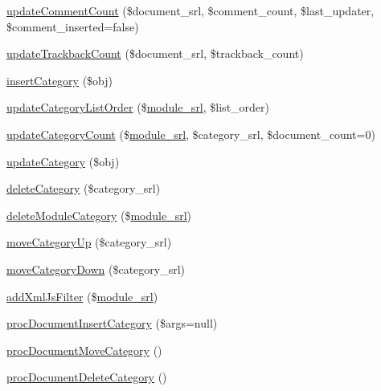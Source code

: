 \begin{DoxyCompactItemize}
\item 
\hyperlink{classdocumentController_a1813c01d82596b3ddb48c1bde746428e}{update\+Comment\+Count} (\$document\+\_\+srl, \$comment\+\_\+count, \$last\+\_\+updater, \$comment\+\_\+inserted=false)
\item 
\hyperlink{classdocumentController_ab932f88ad36638495bb5db441737edef}{update\+Trackback\+Count} (\$document\+\_\+srl, \$trackback\+\_\+count)
\item 
\hyperlink{classdocumentController_a5809b6e744e354b7979788f8a4d2d825}{insert\+Category} (\$obj)
\item 
\hyperlink{classdocumentController_a6f3fe3265fd98035ffdd849a03dbe45c}{update\+Category\+List\+Order} (\$\hyperlink{ko_8install_8php_a370bb6450fab1da3e0ed9f484a38b761}{module\+\_\+srl}, \$list\+\_\+order)
\item 
\hyperlink{classdocumentController_a6c2c3cad331e43a7fff774142fe62d00}{update\+Category\+Count} (\$\hyperlink{ko_8install_8php_a370bb6450fab1da3e0ed9f484a38b761}{module\+\_\+srl}, \$category\+\_\+srl, \$document\+\_\+count=0)
\item 
\hyperlink{classdocumentController_a7a4e53cda0765a416280e403b6193b0a}{update\+Category} (\$obj)
\item 
\hyperlink{classdocumentController_ad5840bc0f6ed0040779c5d90d8c327a6}{delete\+Category} (\$category\+\_\+srl)
\item 
\hyperlink{classdocumentController_a8a357bcedee02e8fda122ed24f2a9c1c}{delete\+Module\+Category} (\$\hyperlink{ko_8install_8php_a370bb6450fab1da3e0ed9f484a38b761}{module\+\_\+srl})
\item 
\hyperlink{classdocumentController_a16a00fabad8b270e40d7fa196350280c}{move\+Category\+Up} (\$category\+\_\+srl)
\item 
\hyperlink{classdocumentController_ab6befd47268a1fbfcc56dda3c3a71dc4}{move\+Category\+Down} (\$category\+\_\+srl)
\item 
\hyperlink{classdocumentController_a1fe6155cfd253e19d0583cc74a2cab35}{add\+Xml\+Js\+Filter} (\$\hyperlink{ko_8install_8php_a370bb6450fab1da3e0ed9f484a38b761}{module\+\_\+srl})
\item 
\hyperlink{classdocumentController_aad9894e1432083a62a883568c7b3a42b}{proc\+Document\+Insert\+Category} (\$args=null)
\item 
\hyperlink{classdocumentController_a6bb8b84c1f775b59f74ef8d68ba48f55}{proc\+Document\+Move\+Category} ()
\item 
\hyperlink{classdocumentController_a60d6012f96c71ee539d4152bc2c6f994}{proc\+Document\+Delete\+Category} ()

\end{DoxyCompactItemize}
